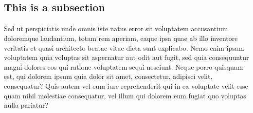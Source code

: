     \subsection{This is a subsection}
    \paragraph{}
    Sed ut perspiciatis unde omnis iste natus error sit voluptatem accusantium doloremque laudantium, totam rem aperiam,
    eaque ipsa quae ab illo inventore veritatis et quasi architecto beatae vitae dicta sunt explicabo. Nemo enim ipsam
    voluptatem quia voluptas sit aspernatur aut odit aut fugit, sed quia consequuntur magni dolores eos qui ratione
    voluptatem sequi nesciunt. Neque porro quisquam est, qui dolorem ipsum quia dolor sit amet, consectetur, adipisci
    velit, consequatur? Quis autem vel eum iure reprehenderit qui in ea voluptate velit esse quam nihil molestiae
    consequatur, vel illum qui dolorem eum fugiat quo voluptas nulla pariatur?

    \begin{table}[h!]
        \centering
        \caption{Fisher's Iris data}
        \label{tab:table1}
    \end{table}

\newpage
